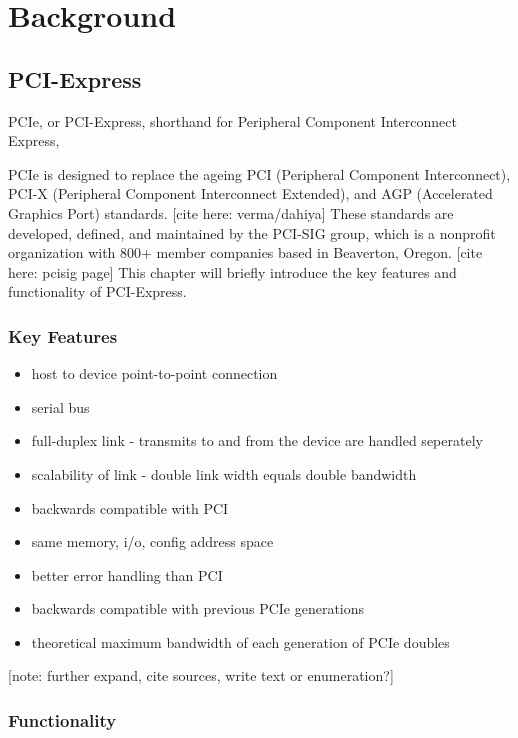 
\chapter{Background}\label{chapter:Background}

\section{PCI-Express}
PCIe, or PCI-Express, shorthand for Peripheral Component Interconnect Express, 


PCIe is designed to replace the ageing PCI (Peripheral Component Interconnect), PCI-X (Peripheral Component Interconnect Extended), and AGP (Accelerated Graphics Port) standards. [cite here: verma/dahiya] These standards are developed, defined, and maintained by the PCI-SIG group, which is a nonprofit organization with 800+ member companies based in Beaverton, Oregon. [cite here: pcisig page] This chapter will briefly introduce the key features and functionality of PCI-Express.

\subsection{Key Features}

\begin{itemize}
\item host to device point-to-point connection
\item serial bus
\item full-duplex link - transmits to and from the device are handled seperately
\item scalability of link - double link width equals double bandwidth
\item backwards compatible with PCI
\item same memory, i/o, config address space
\item better error handling than PCI
\item backwards compatible with previous PCIe generations
\item theoretical maximum bandwidth of each generation of PCIe doubles
\end{itemize}

[note: further expand, cite sources, write text or enumeration?]

\subsection{Functionality}

